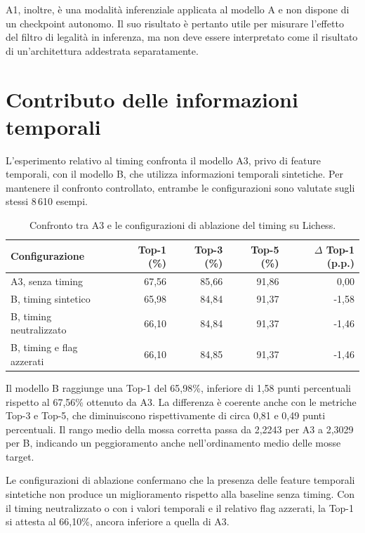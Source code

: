 A1, inoltre, è una modalità inferenziale applicata al modello A e non dispone di un checkpoint autonomo. Il suo risultato è pertanto utile per misurare l'effetto del filtro di legalità in inferenza, ma non deve essere interpretato come il risultato di un'architettura addestrata separatamente.

\section{Contributo delle informazioni temporali}

L'esperimento relativo al timing confronta il modello A3, privo di feature temporali, con il modello B, che utilizza informazioni temporali sintetiche. Per mantenere il confronto controllato, entrambe le configurazioni sono valutate sugli stessi 8\,610 esempi.

\begin{table}[htbp]
    \centering
    \small
    \caption{Confronto tra A3 e le configurazioni di ablazione del timing su Lichess.}
    \label{tab:timing-ablation-results}
    \begin{tabular}{lrrrr}
        \toprule
        Configurazione & Top-1 (\%) & Top-3 (\%) & Top-5 (\%) & \(\Delta\) Top-1 (p.p.) \\
        \midrule
        A3, senza timing & 67,56 & 85,66 & 91,86 & 0,00 \\
        B, timing sintetico & 65,98 & 84,84 & 91,37 & -1,58 \\
        B, timing neutralizzato & 66,10 & 84,84 & 91,37 & -1,46 \\
        B, timing e flag azzerati & 66,10 & 84,85 & 91,37 & -1,46 \\
        \bottomrule
    \end{tabular}
\end{table}

Il modello B raggiunge una Top-1 del 65,98\%, inferiore di 1,58 punti percentuali rispetto al 67,56\% ottenuto da A3. La differenza è coerente anche con le metriche Top-3 e Top-5, che diminuiscono rispettivamente di circa 0,81 e 0,49 punti percentuali. Il rango medio della mossa corretta passa da 2,2243 per A3 a 2,3029 per B, indicando un peggioramento anche nell'ordinamento medio delle mosse target.

Le configurazioni di ablazione confermano che la presenza delle feature temporali sintetiche non produce un miglioramento rispetto alla baseline senza timing. Con il timing neutralizzato o con i valori temporali e il relativo flag azzerati, la Top-1 si attesta al 66,10\%, ancora inferiore a quella di A3.

